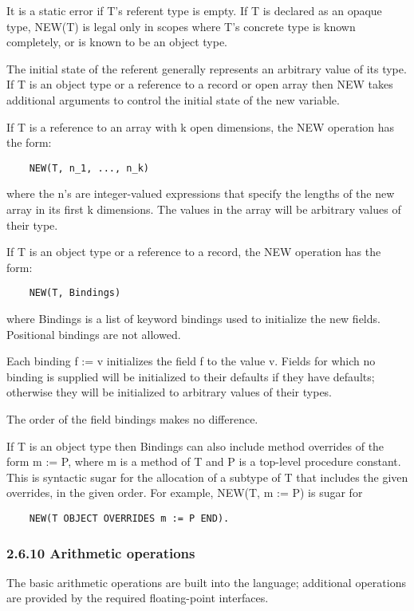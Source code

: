 \documentclass[10pt]{article}
\begin{document}
It is a static error if T's referent type is empty.  If T is declared as an
opaque type, NEW(T) is legal only in scopes where T's concrete type is known
completely, or is known to be an object type.

The initial state of the referent generally represents an arbitrary value of
its type.  If T is an object type or a reference to a record or open array
then NEW takes additional arguments to control the initial state of the new
variable.

If T is a reference to an array with k open dimensions, the NEW operation has
the form:
\begin{verbatim}
    NEW(T, n_1, ..., n_k)
\end{verbatim}
where the n's are integer-valued expressions that specify the lengths of the
new array in its first k dimensions.  The values in the array will be
arbitrary values of their type.

If T is an object type or a reference to a record, the NEW operation has the
form:
\begin{verbatim}
    NEW(T, Bindings)
\end{verbatim}
where Bindings is a list of keyword bindings used to initialize the new
fields.  Positional bindings are not allowed.

Each binding f := v initializes the field f to the value v.  Fields for which
no binding is supplied will be initialized to their defaults if they have
defaults; otherwise they will be initialized to arbitrary values of their
types.

The order of the field bindings makes no difference.

If T is an object type then Bindings can also include method overrides of the
form m := P, where m is a method of T and P is a top-level procedure constant.
This is syntactic sugar for the allocation of a subtype of T that includes the
given overrides, in the given order.  For example, NEW(T, m := P) is sugar for
\begin{verbatim}
    NEW(T OBJECT OVERRIDES m := P END).
\end{verbatim}

\subsubsection*{2.6.10 Arithmetic operations}

The basic arithmetic operations are built into the language; additional
operations are provided by the required floating-point interfaces.
\end{document}

